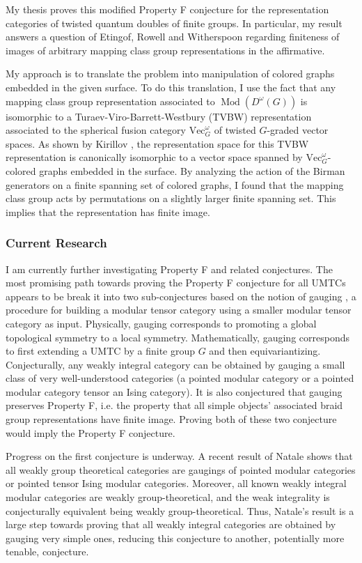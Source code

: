 \documentclass[12pt]{article}
\DeclareMathOperator{\Mod}{Mod}
\theoremstyle{plain} \numberwithin{equation}{section}
\theoremstyle{definition}
\begin{document}
My thesis proves this modified Property F conjecture for the representation categories of twisted quantum doubles of finite groups.  In particular, my result answers a question of Etingof, Rowell and Witherspoon \cite{erw} regarding finiteness of images of arbitrary mapping class group representations in the affirmative.

My approach is to translate the problem into manipulation of colored graphs embedded in the given surface. To do this translation, I use the fact that any mapping class group representation associated to $\Mod(D^\omega(G))$ is isomorphic to a Turaev-Viro-Barrett-Westbury (TVBW) representation \cite{bw} associated to the spherical fusion category $\text{Vec}_G^\omega$ of twisted $G$-graded vector spaces. As shown by Kirillov \cite{k} , the representation space for this TVBW representation is canonically isomorphic to a vector space spanned by $\text{Vec}_G^\omega$-colored graphs embedded in the surface. By analyzing the action of the Birman generators \cite{birman} on a finite spanning set of colored graphs, I found that the mapping class group acts by permutations on a slightly larger finite spanning set. This implies that the representation has finite image.

\subsubsection*{Current Research}

I am currently further investigating Property F and related conjectures.  The most promising path towards proving the Property F conjecture for all UMTCs appears to be break it into two sub-conjectures based on the notion of gauging \cite{bbcw}, a procedure for building a modular tensor category using  a smaller modular tensor category as input.   Physically, gauging corresponds to promoting a global topological symmetry to a local symmetry.  Mathematically, gauging corresponds to first extending a UMTC by a finite group $G$ and then equivariantizing. Conjecturally, any weakly integral category can be obtained by gauging a small class of very well-understood categories (a pointed modular category or a pointed modular category tensor an Ising category).   It is also conjectured that gauging  preserves Property F, i.e. the property that all simple objects’ associated braid group representations have finite image.  Proving both of these two conjecture would imply the Property F conjecture.

Progress on the first conjecture is underway. A recent result of Natale \cite{n} shows that all weakly group theoretical categories are gaugings of pointed modular categories or pointed tensor Ising modular categories.  Moreover, all known weakly integral modular categories are weakly group-theoretical, and the weak integrality is conjecturally equivalent being weakly group-theoretical.  Thus, Natale's result is a large step towards proving that all weakly integral categories are obtained by gauging very simple ones, reducing this conjecture to another, potentially more tenable, conjecture.
\end{document}
